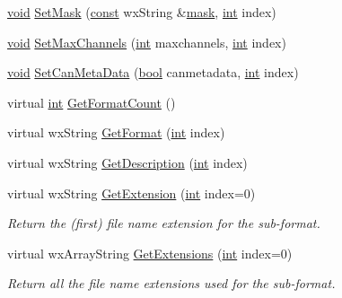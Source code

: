 \begin{DoxyCompactItemize}
\item 
\hyperlink{sound_8c_ae35f5844602719cf66324f4de2a658b3}{void} \hyperlink{class_export_plugin_ab88b6de9a14cd76c2b01125e2a9200c7}{Set\+Mask} (\hyperlink{getopt1_8c_a2c212835823e3c54a8ab6d95c652660e}{const} wx\+String \&\hyperlink{structmask}{mask}, \hyperlink{xmltok_8h_a5a0d4a5641ce434f1d23533f2b2e6653}{int} index)
\item 
\hyperlink{sound_8c_ae35f5844602719cf66324f4de2a658b3}{void} \hyperlink{class_export_plugin_a2b5cc82b446a56abe949c149619f3396}{Set\+Max\+Channels} (\hyperlink{xmltok_8h_a5a0d4a5641ce434f1d23533f2b2e6653}{int} maxchannels, \hyperlink{xmltok_8h_a5a0d4a5641ce434f1d23533f2b2e6653}{int} index)
\item 
\hyperlink{sound_8c_ae35f5844602719cf66324f4de2a658b3}{void} \hyperlink{class_export_plugin_acb17bb0af5f50e82b38d1be05e036cc7}{Set\+Can\+Meta\+Data} (\hyperlink{mac_2config_2i386_2lib-src_2libsoxr_2soxr-config_8h_abb452686968e48b67397da5f97445f5b}{bool} canmetadata, \hyperlink{xmltok_8h_a5a0d4a5641ce434f1d23533f2b2e6653}{int} index)
\item 
virtual \hyperlink{xmltok_8h_a5a0d4a5641ce434f1d23533f2b2e6653}{int} \hyperlink{class_export_plugin_a8ab6333ed3f9fffee2e8c2b23dbf4b9c}{Get\+Format\+Count} ()
\item 
virtual wx\+String \hyperlink{class_export_plugin_aa0c0b5ec6fc562696bbedc17940c17a1}{Get\+Format} (\hyperlink{xmltok_8h_a5a0d4a5641ce434f1d23533f2b2e6653}{int} index)
\item 
virtual wx\+String \hyperlink{class_export_plugin_afac1d82db7524ce0bb692b3966040053}{Get\+Description} (\hyperlink{xmltok_8h_a5a0d4a5641ce434f1d23533f2b2e6653}{int} index)
\item 
virtual wx\+String \hyperlink{class_export_plugin_a6a65c40c7d72a0feaabad11a9e893768}{Get\+Extension} (\hyperlink{xmltok_8h_a5a0d4a5641ce434f1d23533f2b2e6653}{int} index=0)
\begin{DoxyCompactList}\small\item\em Return the (first) file name extension for the sub-\/format. \end{DoxyCompactList}\item 
virtual wx\+Array\+String \hyperlink{class_export_plugin_a09fc5c78e4d236a6f75f670a21c67f60}{Get\+Extensions} (\hyperlink{xmltok_8h_a5a0d4a5641ce434f1d23533f2b2e6653}{int} index=0)
\begin{DoxyCompactList}\small\item\em Return all the file name extensions used for the sub-\/format. \end{DoxyCompactList}\item 

\end{DoxyCompactItemize}
